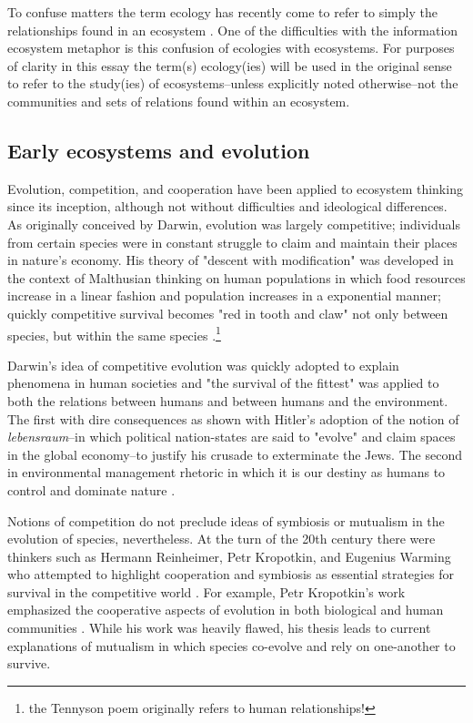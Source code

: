 To confuse matters the term ecology has recently come to refer to simply the relationships found in an ecosystem \citep{oed_2008}. One of the difficulties with the information ecosystem metaphor is this confusion of ecologies with ecosystems. For purposes of clarity in this essay the term(s) ecology(ies) will be used in the original sense to refer to the study(ies) of ecosystems--unless explicitly noted otherwise--not the communities and sets of relations found within an ecosystem. 

\subsection{Early ecosystems and evolution}

Evolution, competition, and cooperation have been applied to ecosystem thinking since its inception, although not without difficulties and ideological differences. As originally conceived by Darwin, evolution was largely competitive; individuals from certain species were in constant struggle to claim and maintain their places in nature's economy. His theory of "descent with modification" was developed in the context of Malthusian thinking on human populations in which food resources increase in a linear fashion and population increases in a exponential manner; quickly competitive survival becomes "red in tooth and claw" not only between species, but within the same species \citep{stoddart_1966,tennyson_1849}.\footnote{the Tennyson poem originally refers to human relationships!} 

Darwin's idea of competitive evolution was quickly adopted to explain phenomena in human societies and "the survival of the fittest" was applied to both the relations between humans and between humans and the environment. The first with dire consequences as shown with Hitler's adoption of the notion of \textit{lebensraum}--in which political nation-states are said to "evolve" and claim spaces in the global economy--to justify his crusade to exterminate the Jews. The second in environmental management rhetoric in which it is our destiny as humans to control and dominate nature \citep{stoddart_1966,worster_1977}. 

Notions of competition do not preclude ideas of symbiosis or mutualism in the evolution of species, nevertheless. At the turn of the 20th century there were thinkers such as Hermann Reinheimer, Petr Kropotkin, and Eugenius Warming who attempted to highlight cooperation and symbiosis as essential strategies for survival in the competitive world \citep{worster_1977}. For example, Petr Kropotkin's work emphasized the cooperative aspects of evolution in both biological and human communities \citep{kropotkin_1902}. While his work was heavily flawed, his thesis leads to current explanations of mutualism in which species co-evolve and rely on one-another to survive. 

